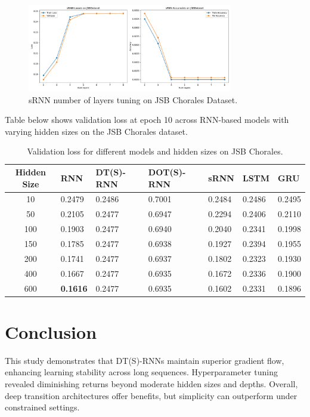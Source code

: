 \documentclass{article}
\begin{document}
\begin{figure}[H]
    \centering
    \includegraphics[width=0.8\textwidth]{JSB/sRNN_JSBDataset_num_layers_comparison.pdf}
    \caption{sRNN number of layers tuning on JSB Chorales Dataset.}
    \label{fig:srnn-num-layers-tuning-jsb}
\end{figure}

Table below shows validation loss at epoch 10 across RNN-based models with varying hidden sizes on the JSB Chorales dataset.
\begin{table}[H]
\centering
\small
\begin{tabularx}{\textwidth}{|c|X|X|X|X|X|X|}
\hline
\textbf{Hidden Size} & \textbf{RNN} & \textbf{DT(S)-RNN} & \textbf{DOT(S)-RNN} & \textbf{sRNN} & \textbf{LSTM} & \textbf{GRU} \\
\hline
10  & 0.2479 & 0.2486 & 0.7001 & 0.2484 & 0.2486 & 0.2495 \\
50  & 0.2105 & 0.2477 & 0.6947 & 0.2294 & 0.2406 & 0.2110 \\
100 & 0.1903 & 0.2477 & 0.6940 & 0.2040 & 0.2341 & 0.1998 \\
150 & 0.1785 & 0.2477 & 0.6938 & 0.1927 & 0.2394 & 0.1955 \\
200 & 0.1741 & 0.2477 & 0.6937 & 0.1802 & 0.2323 & 0.1930 \\
400 & 0.1667 & 0.2477 & 0.6935 & 0.1672 & 0.2336 & 0.1900 \\
600 & \textbf{0.1616} & 0.2477 & 0.6935 & 0.1602 & 0.2331 & 0.1896 \\
\hline
\end{tabularx}
\caption{Validation loss for different models and hidden sizes on JSB Chorales.}
\label{tab:jsb_val_loss_table}
\end{table}

\section{Conclusion}
This study demonstrates that DT(S)-RNNs maintain superior gradient flow, enhancing learning stability across long sequences. Hyperparameter tuning revealed diminishing returns beyond moderate hidden sizes and depths. Overall, deep transition architectures offer benefits, but simplicity can outperform under constrained settings.



\end{document}
